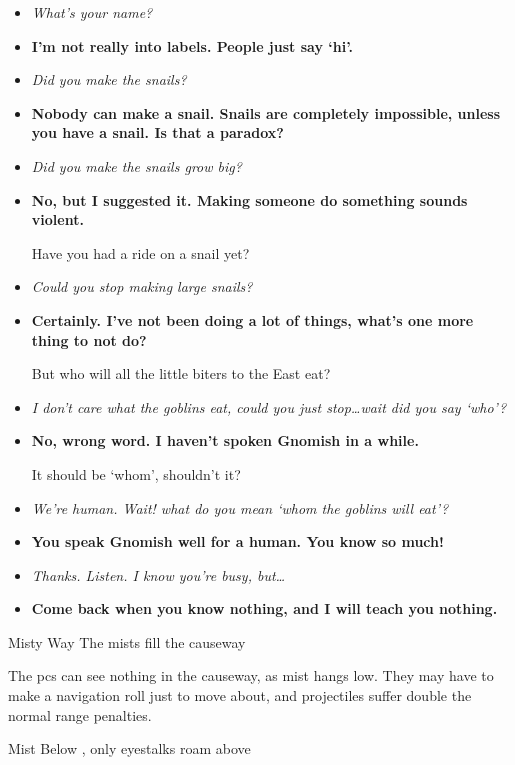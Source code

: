 \begin{itemize}
  \item\it
  What's your name?
  \item[\adforn{54}]\bf
  I'm not really into labels.
  People just say `hi'.
  \item\it
  Did you make the snails?
  \item[\adforn{54}]\bf
  Nobody can make a snail.
  Snails are completely impossible, unless you have a snail.
  Is that a paradox?
  \item\it
  Did you make the snails grow big?
  \item[\adforn{54}]\bf
  No, but I suggested it.
  Making someone do something sounds violent.

  Have you had a ride on a snail yet?
  \item\it
  Could you stop making large snails?
  \item[\adforn{54}]\bf
  Certainly.
  I've not been doing a lot of things, what's one more thing to not do?

  But who will all the little biters to the East eat?
  \item\it
  I don't care what the goblins eat, could you just stop\ldots wait did you say `who'?
  \item[\adforn{54}]\bf
  No, wrong word.
  I haven't spoken Gnomish in a while.

  It should be `whom', shouldn't it?
  \item\it
  We're human.
  Wait! what do you mean `whom the goblins will eat'?
  \item[\adforn{54}]\bf
  You speak Gnomish well for a human.
  You know so much!
  \item\it
  Thanks.
  Listen.
  I know you're busy, but\ldots
  \item[\adforn{54}]\bf
  Come back when you know nothing, and I will teach you nothing.
\end{itemize}

\LifeElder

\showStdSpells

{Misty Way}%
{The mists fill the causeway}%

The \glspl{pc} can see nothing in the causeway, as mist hangs low.
They may have to make a navigation roll just to move about, and projectiles suffer double the normal range penalties.

{Mist Below}%
{, only eyestalks roam above}%

